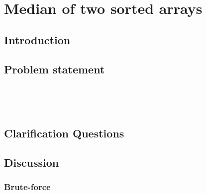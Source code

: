 %

\chapter{Median of two sorted arrays }
\label{ch:median_sorted_arrays}
\section*{Introduction}

\section{Problem statement}
\begin{exercise}

\end{exercise}


\begin{example}
	\hfill \
	
\end{example}

\begin{example}
	\hfill \
	
\end{example}

\section{Clarification Questions}

\begin{QandA}
	\item 
	\begin{answered}
		\textit{}
	\end{answered}
	
\end{QandA}

\section{Discussion}
\label{median_sorted_arrays:sec:discussion}


\subsection{Brute-force}
\label{median_sorted_arrays:sec:bruteforce}



